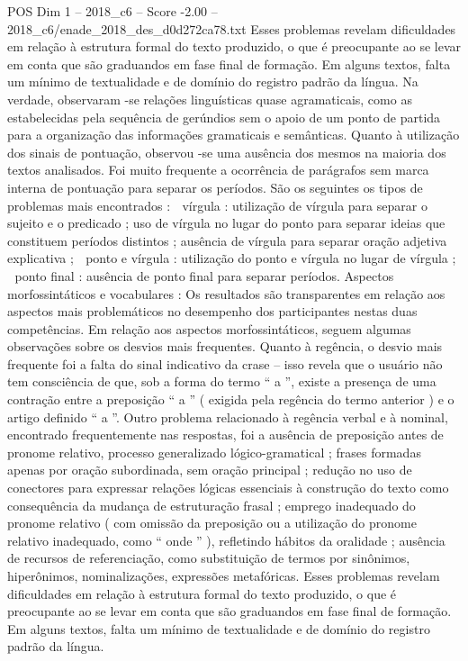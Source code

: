 \begin{textsample}{POS Dim 1 – 2018\_c6 – Score -2.00 – 2018\_c6/enade\_2018\_des\_d0d272ca78.txt}
Esses problemas revelam dificuldades em relação à estrutura formal do texto produzido, o que é preocupante ao se levar em conta que são graduandos em fase final de formação.
Em alguns textos, falta um mínimo de textualidade e de domínio do registro padrão da língua.
Na verdade, observaram -se relações linguísticas quase agramaticais, como as estabelecidas pela sequência de gerúndios sem o apoio de um ponto de partida para a organização das informações gramaticais e semânticas.
Quanto à utilização dos sinais de pontuação, observou -se uma ausência dos mesmos na maioria dos textos analisados.
Foi muito frequente a ocorrência de parágrafos sem marca interna de pontuação para separar os períodos.
São os seguintes os tipos de problemas mais encontrados :  vírgula : utilização de vírgula para separar o sujeito e o predicado ; uso de vírgula no lugar do ponto para separar ideias que constituem períodos distintos ; ausência de vírgula para separar oração adjetiva explicativa ;  ponto e vírgula : utilização do ponto e vírgula no lugar de vírgula ;  ponto final : ausência de ponto final para separar períodos.
Aspectos morfossintáticos e vocabulares : Os resultados são transparentes em relação aos aspectos mais problemáticos no desempenho dos participantes nestas duas competências.
Em relação aos aspectos morfossintáticos, seguem algumas observações sobre os desvios mais frequentes.
Quanto à regência, o desvio mais frequente foi a falta do sinal indicativo da crase – isso revela que o usuário não tem consciência de que, sob a forma do termo “ a ”, existe a presença de uma contração entre a preposição “ a ” ( exigida pela regência do termo anterior ) e o artigo definido “ a ”.
Outro problema relacionado à regência verbal e à nominal, encontrado frequentemente nas respostas, foi a ausência de preposição antes de pronome relativo, processo generalizado lógico-gramatical ; frases formadas apenas por oração subordinada, sem oração principal ; redução no uso de conectores para expressar relações lógicas essenciais à construção do texto como consequência da mudança de estruturação frasal ; emprego inadequado do pronome relativo ( com omissão da preposição ou a utilização do pronome relativo inadequado, como “ onde ” ), refletindo hábitos da oralidade ; ausência de recursos de referenciação, como substituição de termos por sinônimos, hiperônimos, nominalizações, expressões metafóricas.
Esses problemas revelam dificuldades em relação à estrutura formal do texto produzido, o que é preocupante ao se levar em conta que são graduandos em fase final de formação.
Em alguns textos, falta um mínimo de textualidade e de domínio do registro padrão da língua.

\end{textsample}
